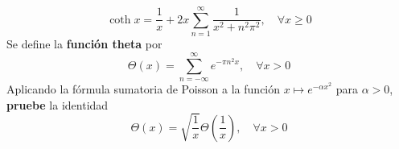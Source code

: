 \documentclass[12pt]{report}
\theoremstyle{largebreak}
\renewcommand{\geq}{\ensuremath{\geqslant}}
\begin{document}
\begin{excer}
\begin{enumerate}
\begin{equation*}
                \coth x = \frac{1}{x}+2x\sum_{ n=1}^{\infty}\frac{1}{x^2+n^2\pi^2},\quad\forall x\geq0
            \end{equation*}
            Se define la \textbf{función theta} por
            \begin{equation*}
                \Theta(x)=\sum_{ n=-\infty}^{\infty}e^{ -\pi n^2x},\quad\forall x>0
            \end{equation*}
            Aplicando la fórmula sumatoria de Poisson a la función $x\mapsto e^{-\alpha x^2}$ para $\alpha>0$, \textbf{pruebe} la identidad
            \begin{equation*}
                \Theta(x)=\sqrt{\frac{1}{x}}\Theta\left(\frac{1}{x}\right),\quad\forall x>0
            \end{equation*}
        \end{enumerate}
    \end{excer}
\end{document}
